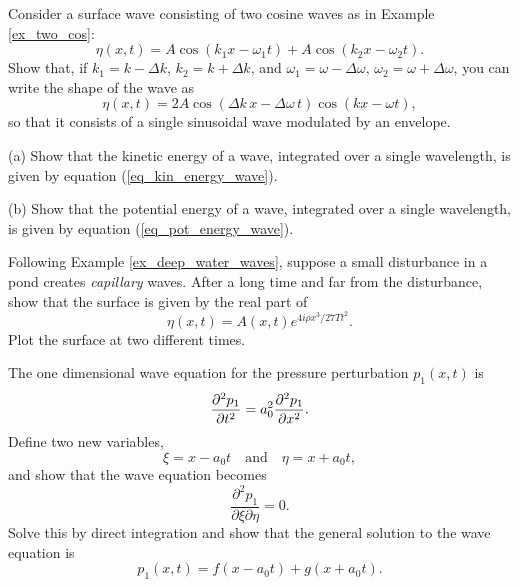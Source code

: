 \begin{problem}
\label{prob_two_cosines}
Consider a surface wave consisting of two cosine waves as in Example \ref{ex_two_cos}:
\[
\eta(x, t) = A \cos(k_1 x - \omega_1 t) + A \cos(k_2 x - \omega_2 t).
\]
Show that, if $k_1 = k - \Delta k$, $k_2 = k + \Delta k$, and $\omega_1 = \omega - \Delta \omega$, $\omega_2 = \omega + \Delta \omega$, you can write the shape of the wave as
\[
\eta(x, t) = 2A \cos(\Delta k \, x - \Delta \omega \, t) \cos(kx - \omega t),
\]
so that it consists of a single sinusoidal wave modulated by an envelope.
\end{problem}




\begin{problem}
\label{prob_energy}

(a) Show that the kinetic energy of a wave, integrated over a single wavelength, is given by equation (\ref{eq_kin_energy_wave}).

(b) Show that the potential energy of a wave, integrated over a single wavelength, is given by equation (\ref{eq_pot_energy_wave}).
\end{problem}



\begin{problem}
Following Example \ref{ex_deep_water_waves}, suppose a small disturbance in a pond creates \emph{capillary} waves.  After a long time and far from the disturbance, show that the surface is given by the real part of
\[
\eta(x, t) = A(x, t) e^{4i\rho x^3 / 27 T t^2}.
\]
Plot the surface at two different times.
\end{problem}



\begin{problem}
\label{prob_wave_sol}
The one dimensional wave equation for the pressure perturbation $p_1(x, t)$ is
\[
\frac{\partial^2 {p_1}}{\partial {t}^2} = a_0^2 \frac{\partial^2 {p_1}}{\partial {x}^2}.
\]
Define two new variables,
\[
\xi = x - a_0t \quad \text{and}\quad \eta = x + a_0t,
\]
and show that the wave equation becomes
\[
\frac{\partial ^2 p_1}{\partial \xi \partial \eta} = 0.
\]
Solve this by direct integration and show that the general solution to the wave equation is
\[
p_1(x, t) = f(x - a_0t) + g(x + a_0t).
\]
\end{problem}





